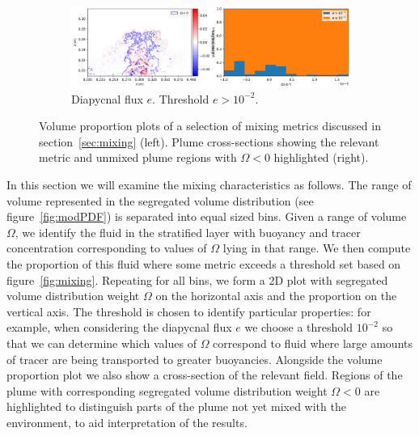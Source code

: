 \documentclass[a4paper]{article}
\begin{document}
\begin{figure}
{\begin{subfigure}[c]{0.6\textwidth}
			\centering
			\includegraphics[width=\textwidth]{e_vol}
			\caption{Diapycnal flux $e$. Threshold $e > 10^{-2}$.}
			\label{fig:e_vol}
		\end{subfigure}
	}
	\caption{Volume proportion plots of a selection of mixing metrics discussed in section~\ref{sec:mixing}
	(left). Plume cross-sections showing the relevant metric and unmixed plume regions
	with $\Omega < 0$ highlighted (right).}
\end{figure}

In this section we will examine the mixing characteristics as follows. The range of volume represented in the
segregated volume distribution (see figure~\ref{fig:modPDF}) is separated into equal sized bins. Given a range
of volume $\Omega$, we identify the fluid in the stratified layer with buoyancy and tracer concentration
corresponding to values of $\Omega$ lying in that range. We then compute the proportion of this fluid where
some metric exceeds a threshold set based on figure~\ref{fig:mixing}. Repeating for all bins, we form a 2D
plot with segregated volume distribution weight $\Omega$ on the horizontal axis and the proportion on the
vertical axis. The threshold is chosen to identify particular properties: for example, when considering the
diapycnal flux $e$ we choose a threshold $10^{-2}$ so that we can determine which values of $\Omega$
correspond to fluid where large amounts of tracer are being transported to greater buoyancies.  Alongside the
volume proportion plot we also show a cross-section of the relevant field. Regions of the plume with
corresponding segregated volume distribution weight $\Omega < 0$ are highlighted to distinguish parts of the
plume not yet mixed with the environment, to aid interpretation of the results.
\end{document}
